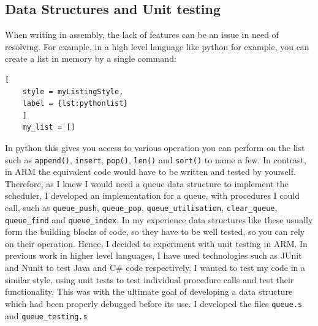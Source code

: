 \subsection{Data Structures and Unit testing}
When writing in assembly, the lack of features can be an issue in need of resolving. For example, in a high level language like python for example, you can create a list in memory by a single command: 


\begin{lstlisting}[
	style = myListingStyle,
	label = {lst:pythonlist}
	]
	my_list = []
\end{lstlisting}

In python this gives you access to various operation you can perform on the list such as \verb|append()|, \verb|insert|, \verb|pop()|, \verb|len()| and  \verb|sort()| to name a few. In contrast, in ARM the equivalent code would have to be written and tested by yourself. Therefore, as I knew I would need a queue data structure to implement the scheduler, I developed an implementation for a queue, with procedures I could call,
 such as \verb|queue_push|, \verb|queue_pop|, \verb|queue_utilisation|, \verb|clear_queue|, \verb|queue_find| and \verb|queue_index|. In my experience data structures like these usually form the building blocks of code, so they have to be well tested, so you can rely on their operation. Hence, I decided to experiment with unit testing in ARM. In previous work in higher level languages, I have used technologies such as JUnit \cite{junit} and Nunit \cite{nunit} to test Java \cite{java} and C\# \cite{csharp} code respectively.  I wanted to test my code in a similar style, using unit tests to test individual procedure calls and test their functionality. This was with the ultimate goal of developing a data structure which had been properly debugged before its use. I developed the files \verb|queue.s| and \verb|queue_testing.s|






















